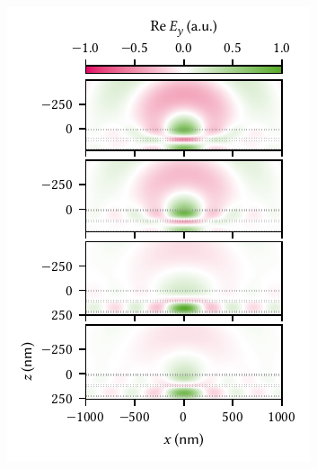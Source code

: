 \begin{marginfigure}
    \centering
    \includegraphics{img/pdf/experiment/tmm_green}
    \caption[]{}
    \label{fig:exp:tmm:green}
\end{marginfigure}

